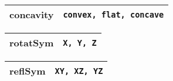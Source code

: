 \documentclass[10pt, a4paper]{article}
\begin{document}
\begin{table}[H]
\def\baselinestretch{1}
{\small
\begin{tabular}{|l|l|}
\hline
{\sc concavity} & {\tt convex, flat, concave} \\
\hline
\end{tabular}
} 
\def\baselinestretch{1.9}
\end{table}

\begin{table}[H]
\def\baselinestretch{1}
{\small
\begin{tabular}{|l|l|}
\hline
{\sc rotatSym} & {\tt X, Y, Z} \\
\hline
\end{tabular}
} 
\def\baselinestretch{1.9}
\end{table}

\begin{table}[H]
\def\baselinestretch{1}
{\small
\begin{tabular}{|l|l|}
\hline
{\sc reflSym} & {\tt XY, XZ, YZ} \\
\hline
\end{tabular}
} 
\def\baselinestretch{1.9}
\end{table}
\end{document}
